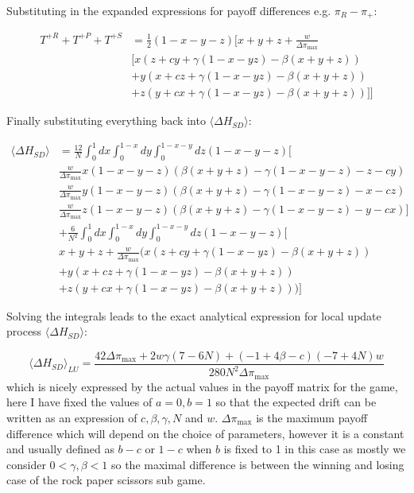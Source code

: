 \documentclass[./main.tex]{subfiles}
\begin{document}
Substituting in the expanded expressions for payoff differences e.g. $\pi_R - \pi_+$:

\begin{align}
T^{+R} + T^{+P} + T^{+S} &= 
\frac{1}{2}(1-x-y-z)\Bigg[x + y + z + \frac{w}{\Delta \pi_{\text{max}}}\nonumber \\
&\Big[x(z + cy + \gamma(1 - x - y z) - \beta(x+y+z)) \nonumber\\
&+ y(x + cz + \gamma(1 - x - y z) - \beta(x+y+z)) \nonumber\\
&+ z(y + cx + \gamma(1 - x - y z) - \beta(x+y+z))\Big]\nonumber
\Bigg]
\end{align}


Finally substituting everything back into $\langle \Delta H_{SD} \rangle$:


\begin{align}
\langle \Delta H_{SD} \rangle &= \frac{12}{N} \int_{0}^{1}dx \int_{0}^{1-x}dy \int_{0}^{1-x-y}dz 
(1-x-y-z)\Bigg[ \\
&\frac{w}{\Delta \pi_{\text{max}}} x(1-x-y-z)\left(\beta(x+y+z) - \gamma(1-x-y-z) -z -cy\right)\nonumber\\
&\frac{w}{\Delta \pi_{\text{max}}} y(1-x-y-z)\left(\beta(x+y+z) - \gamma(1-x-y-z) -x -cz\right)\nonumber\\
&\frac{w}{\Delta \pi_{\text{max}}} z(1-x-y-z)\left(\beta(x+y+z) - \gamma(1-x-y-z) -y -cx\right)\Bigg] \nonumber\\
&+ \frac{6}{N^2} \int_{0}^{1}dx \int_{0}^{1-x}dy \int_{0}^{1-x-y}dz(1-x-y-z)\Bigg[ \nonumber\\ 
&x + y + z + \frac{w}{\Delta \pi_{\text{max}}} 
\Bigg(x(z + cy + \gamma(1 - x - y z) - \beta(x+y+z)) \nonumber\\
&+ y(x + cz + \gamma(1 - x - y z) - \beta(x+y+z))\nonumber\\
&+ z(y + cx + \gamma(1 - x - y z) - \beta(x+y+z))\Bigg)\nonumber
\Bigg]
\end{align}


Solving the integrals leads to the exact analytical expression for local update process
$\langle \Delta H_{SD} \rangle$:

\begin{equation}
\langle \Delta H_{SD} \rangle_{LU} = 
\frac{42 \Delta \pi_{\text{max}} + 2w \gamma (7 - 6N) + (-1+4\beta - c)(-7 + 4N)w}{280N^2\Delta \pi_{\text{max}}}
\end{equation}
which is nicely expressed by the actual values in the payoff matrix for the game, 
here I have fixed the values of $a=0, b=1$ so that the expected drift can be written as 
an expression of $c, \beta, \gamma, N$ and $w$. $\Delta \pi_{\text{max}}$
is the maximum payoff difference which will depend on the choice of parameters, 
however it is a constant and usually defined as $b - c$ or $1-c$ when $b$ is fixed to 1
in this case as mostly we consider $0 < \gamma, \beta < 1$ so the maximal difference is
between the winning and losing case of the rock paper scissors sub game.
\end{document}
